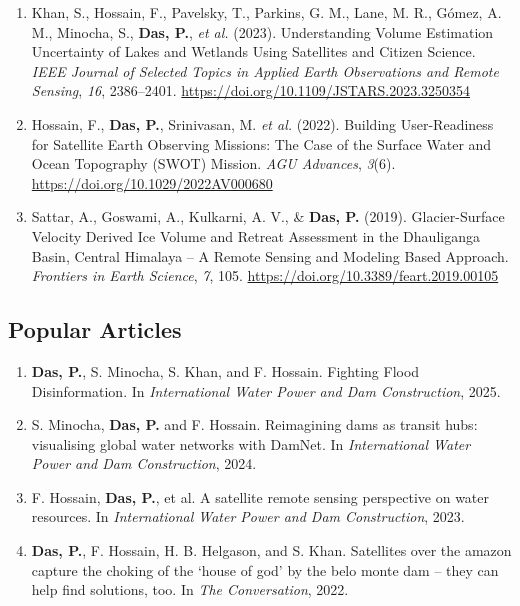 \documentclass[a4paper,9pt]{extarticle}
\begin{document}
\begin{enumerate}
        \item Khan, S., Hossain, F., Pavelsky, T., Parkins, G. M., Lane, M. R., G\'{o}mez, A. M., Minocha, S., \textbf{Das, P.}, \textit{et al.} (2023). Understanding Volume Estimation Uncertainty of Lakes and Wetlands Using Satellites and Citizen Science. \textit{IEEE Journal of Selected Topics in Applied Earth Observations and Remote Sensing}, \textit{16}, 2386--2401. \href{https://doi.org/10.1109/JSTARS.2023.3250354}{https://doi.org/10.1109/JSTARS.2023.3250354}

        \item Hossain, F., \textbf{Das, P.}, Srinivasan, M. \textit{et al.} (2022). Building User-Readiness for Satellite Earth Observing Missions: The Case of the Surface Water and Ocean Topography (SWOT) Mission. \textit{AGU Advances}, \textit{3}(6). \href{https://doi.org/10.1029/2022AV000680}{https://doi.org/10.1029/2022AV000680}

        \item Sattar, A., Goswami, A., Kulkarni, A. V., \& \textbf{Das, P.} (2019). Glacier-Surface Velocity Derived Ice Volume and Retreat Assessment in the Dhauliganga Basin, Central Himalaya -- A Remote Sensing and Modeling Based Approach. \textit{Frontiers in Earth Science}, \textit{7}, 105. \href{https://doi.org/10.3389/feart.2019.00105}{https://doi.org/10.3389/feart.2019.00105}
    \end{enumerate}

    \subsection*{Popular Articles}
    \begin{enumerate}
        \item \textbf{Das, P.}, S. Minocha, S. Khan, and F. Hossain. Fighting Flood Disinformation. In \textit{International Water Power and Dam Construction}, 2025.

        \item S. Minocha, \textbf{Das, P.} and F. Hossain. Reimagining dams as transit hubs: visualising global water networks with DamNet. In \textit{International Water Power and Dam Construction}, 2024.

        \item F. Hossain, \textbf{Das, P.}, et al. A satellite remote sensing perspective on water resources. In \textit{International Water Power and Dam Construction}, 2023.

        \item \textbf{Das, P.}, F. Hossain, H. B. Helgason, and S. Khan. Satellites over the amazon capture the choking of the `house of god' by the belo monte dam -- they can help find solutions, too. In \textit{The Conversation}, 2022.
    \end{enumerate}
\end{document}
